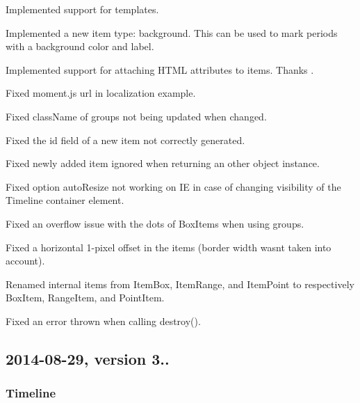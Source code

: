 \begin{DoxyItemize}
\item Implemented support for templates.
\item Implemented a new item type\+: {\ttfamily \textquotesingle{}background\textquotesingle{}}. This can be used to mark periods with a background color and label.
\item Implemented support for attaching H\+T\+ML attributes to items. Thanks .
\item Fixed moment.\+js url in localization example.
\item Fixed {\ttfamily class\+Name} of groups not being updated when changed.
\item Fixed the {\ttfamily id} field of a new item not correctly generated.
\item Fixed newly added item ignored when returning an other object instance.
\item Fixed option {\ttfamily auto\+Resize} not working on IE in case of changing visibility of the Timeline container element.
\item Fixed an overflow issue with the dots of Box\+Items when using groups.
\item Fixed a horizontal 1-\/pixel offset in the items (border width wasn\textquotesingle{}t taken into account).
\item Renamed internal items from {\ttfamily Item\+Box}, {\ttfamily Item\+Range}, and {\ttfamily Item\+Point} to respectively {\ttfamily Box\+Item}, {\ttfamily Range\+Item}, and {\ttfamily Point\+Item}.
\item Fixed an error thrown when calling {\ttfamily destroy()}.
\end{DoxyItemize}

\subsection*{2014-\/08-\/29, version 3..}

\subsubsection*{Timeline}


